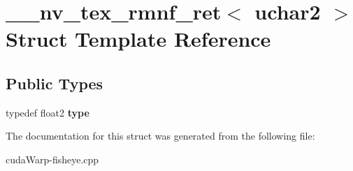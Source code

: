 \hypertarget{struct____nv__tex__rmnf__ret_3_01uchar2_01_4}{}\section{\+\_\+\+\_\+nv\+\_\+tex\+\_\+rmnf\+\_\+ret$<$ uchar2 $>$ Struct Template Reference}
\label{struct____nv__tex__rmnf__ret_3_01uchar2_01_4}
\subsection*{Public Types}
\begin{DoxyCompactItemize}
\item 
typedef float2 {\bfseries type}\hypertarget{struct____nv__tex__rmnf__ret_3_01uchar2_01_4_ae456ee34f72daa4e71658b53a6bae912}{}\label{struct____nv__tex__rmnf__ret_3_01uchar2_01_4_ae456ee34f72daa4e71658b53a6bae912}

\end{DoxyCompactItemize}


The documentation for this struct was generated from the following file\+:\begin{DoxyCompactItemize}
\item 
cuda\+Warp-\/fisheye.\+cpp\end{DoxyCompactItemize}
